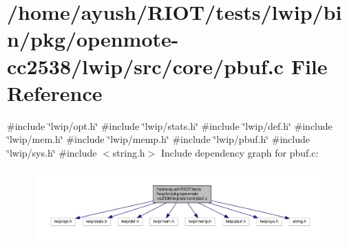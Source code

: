 \hypertarget{openmote-cc2538_2lwip_2src_2core_2pbuf_8c}{}\section{/home/ayush/\+R\+I\+O\+T/tests/lwip/bin/pkg/openmote-\/cc2538/lwip/src/core/pbuf.c File Reference}
\label{openmote-cc2538_2lwip_2src_2core_2pbuf_8c}
{\ttfamily \#include \char`\"{}lwip/opt.\+h\char`\"{}}\newline
{\ttfamily \#include \char`\"{}lwip/stats.\+h\char`\"{}}\newline
{\ttfamily \#include \char`\"{}lwip/def.\+h\char`\"{}}\newline
{\ttfamily \#include \char`\"{}lwip/mem.\+h\char`\"{}}\newline
{\ttfamily \#include \char`\"{}lwip/memp.\+h\char`\"{}}\newline
{\ttfamily \#include \char`\"{}lwip/pbuf.\+h\char`\"{}}\newline
{\ttfamily \#include \char`\"{}lwip/sys.\+h\char`\"{}}\newline
{\ttfamily \#include $<$string.\+h$>$}\newline
Include dependency graph for pbuf.\+c\+:
\nopagebreak
\begin{figure}[H]
\begin{center}
\leavevmode
\includegraphics[width=350pt]{openmote-cc2538_2lwip_2src_2core_2pbuf_8c__incl}
\end{center}
\end{figure}
